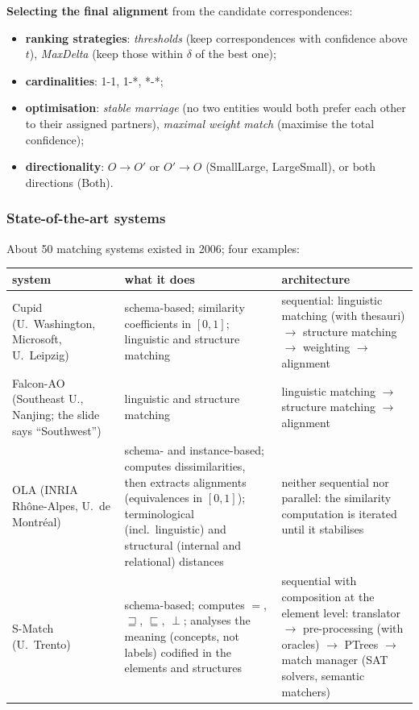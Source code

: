 \textbf{Selecting the final alignment} from the candidate correspondences:
\begin{itemize}[nosep]
  \item \textbf{ranking strategies}: \emph{thresholds} (keep correspondences with
        confidence above $t$), \emph{MaxDelta} (keep those within $\delta$ of the best
        one);
  \item \textbf{cardinalities}: 1-1, 1-*, *-*;
  \item \textbf{optimisation}: \emph{stable marriage} (no two entities would both
        prefer each other to their assigned partners), \emph{maximal weight match}
        (maximise the total confidence);
  \item \textbf{directionality}: $O \to O'$ or $O' \to O$ (SmallLarge, LargeSmall), or
        both directions (Both).
\end{itemize}

\subsubsection{State-of-the-art systems}

About 50 matching systems existed in 2006; four examples:

\begin{center}
\small
\begin{tabularx}{\linewidth}{@{}>{\raggedright\arraybackslash}p{2.6cm} >{\raggedright\arraybackslash}X >{\raggedright\arraybackslash}X@{}}
\toprule
\textbf{system} & \textbf{what it does} & \textbf{architecture} \\
\midrule
Cupid (U.\ Washington, Microsoft, U.\ Leipzig) & schema-based; similarity coefficients in
  $[0,1]$; linguistic and structure matching & sequential: linguistic matching (with
  thesauri) $\to$ structure matching $\to$ weighting $\to$ alignment \\
Falcon-AO (Southeast U., Nanjing; the slide says ``Southwest'') & linguistic and structure matching & linguistic
  matching $\to$ structure matching $\to$ alignment \\
OLA (INRIA Rhône-Alpes, U.\ de Montréal) & schema- and instance-based; computes
  dissimilarities, then extracts alignments (equivalences in $[0,1]$); terminological
  (incl.\ linguistic) and structural (internal and relational) distances & neither
  sequential nor parallel: the similarity computation is iterated until it stabilises \\
S-Match (U.\ Trento) & schema-based; computes $=$, $\sqsupseteq$, $\sqsubseteq$, $\perp$;
  analyses the meaning (concepts, not labels) codified in the elements and structures &
  sequential with composition at the element level: translator $\to$ pre-processing
  (with oracles) $\to$ PTrees $\to$ match manager (SAT solvers, semantic matchers) \\
\bottomrule
\end{tabularx}
\end{center}

